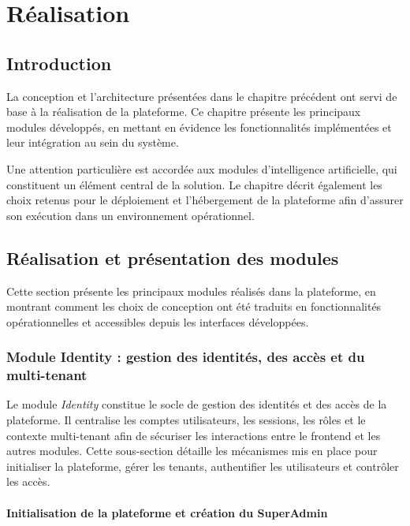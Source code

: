 \chapter{Réalisation}

\minitoc

\newpage

\section{Introduction}

La conception et l'architecture présentées dans le chapitre précédent ont servi de base à la réalisation de la plateforme. Ce chapitre présente les principaux modules développés, en mettant en évidence les fonctionnalités implémentées et leur intégration au sein du système.

Une attention particulière est accordée aux modules d'intelligence artificielle, qui constituent un élément central de la solution. Le chapitre décrit également les choix retenus pour le déploiement et l'hébergement de la plateforme afin d'assurer son exécution dans un environnement opérationnel.

\section{Réalisation et présentation des modules}

Cette section présente les principaux modules réalisés dans la plateforme, en montrant comment les choix de conception ont été traduits en fonctionnalités opérationnelles et accessibles depuis les interfaces développées.

\subsection{Module Identity : gestion des identités, des accès et du multi-tenant}

Le module \textit{Identity} constitue le socle de gestion des identités et des accès de la plateforme. Il centralise les comptes utilisateurs, les sessions, les rôles et le contexte multi-tenant afin de sécuriser les interactions entre le frontend et les autres modules. Cette sous-section détaille les mécanismes mis en place pour initialiser la plateforme, gérer les tenants, authentifier les utilisateurs et contrôler les accès.

\subsubsection{Initialisation de la plateforme et création du SuperAdmin}

